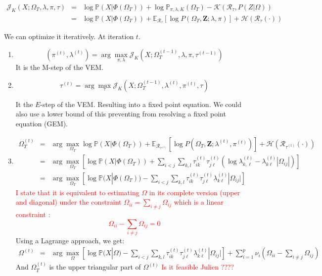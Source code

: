\documentclass[10pt]{article}
\begin{document}
\begin{eqnarray*}
\mathcal{J}_K(X;\Omega_T,\lambda,\pi,\tau) &=& \log  \mathbb{P}(X | \Phi(\Omega_T))  + \log \mathbb{P}_{\pi,\lambda,K}(\Omega_T)  -  \mathcal{K}(\mathcal{R}_{\tau}, P(Z | \Omega))\\
 &=&  \log  \mathbb{P}(X | \Phi(\Omega_T))  + \mathbb{E}_{\mathcal{R}_{\tau}} \left[\log  P(\Omega_T ,\mathbf{Z}; \lambda,\pi)    \right] + \mathcal{H}(\mathcal{R}_{\tau}(\cdot))
 \end{eqnarray*}


We can optimize it iteratively. At iteration $t$. 

\begin{enumerate}
\item  $$(\pi^{(t)},\lambda^{(t)}) = \arg \max_{\pi,\lambda} \mathcal{J}_K(X;\Omega_T^{(t-1)},\lambda,\pi,\tau^{(t-1)})$$
It is the M-step of the VEM. 
\item   $$\tau^{(t)} = \arg \max_{\tau}  \mathcal{J}_K(X;\Omega_T^{(t-1)},\lambda^{(t)},\pi^{(t)},\tau)$$

It the $E$-step of the VEM. Resulting into a fixed point equation.  We could also use a lower bound of this preventing from resolving a fixed point equation (GEM). 

\item 
\begin{eqnarray*}
\Omega^{(t)}_T &=& \arg \max_{\Omega_T}  \log  \mathbb{P}(X | \Phi(\Omega_T))  + \mathbb{E}_{\mathcal{R}_{\tau^{(t)}}} \left[\log  P(\Omega_T ,\mathbf{Z}; \lambda^{(t)},\pi^{(t)})    \right] + \mathcal{H}(\mathcal{R}_{\tau^{(t)}}(\cdot))\\
&=&  \arg \max_{\Omega_T}   \left[ \log  \mathbb{P}(X | \Phi(\Omega_T))  +  \sum_{i<j} \sum_{k,l}\tau^{(t)}_{ik}\tau^{(t)}_{j\ell} (  \log \lambda^{(t)}_{k,\ell}  - \lambda^{(t)}_{k\ell} |\Omega_{ij}| )  \right]  \\
&=&  \arg \max_{\Omega_T}    \left[ \log  \mathbb{P}(X | \Phi(\Omega_T))  -   \sum_{i<j} \sum_{k,l}\tau^{(t)}_{ik}\tau^{(t)}_{j\ell}   \lambda^{(t)}_{k\ell} |\Omega_{ij}|   \right]    
\end{eqnarray*}
\textcolor{red}{I state that it is equivalent to estimating  $\Omega$ in its complete version (upper and diagonal) under the constraint  $\Omega_{ii} = \sum_{i\neq j } \Omega_{ij}$ which is a linear constraint : 
$$  \Omega_{ii} -  \sum_{i\neq j } \Omega_{ij}=0$$}
Using a Lagrange approach, we get: 
\begin{eqnarray*}
\Omega^{(t)}  &=& \arg \max_{\Omega}    \left[ \log  \mathbb{P}(X | \Omega )  -   \sum_{i<j} \sum_{k,l}\tau^{(t)}_{ik}\tau^{(t)}_{j\ell}   \lambda^{(t)}_{k\ell} |\Omega_{ij}|   \right] + \sum_{i=1}^p\nu_i    \left( \Omega_{ii} -  \sum_{i\neq j } \Omega_{ij} \right)
  \end{eqnarray*}
And $\Omega_T^{(t)}$ is the upper triangular part of $\Omega^{(t)}$
\textcolor{red}{Is it feasible Julien ???? }


\end{enumerate}



  
 
\end{document}
